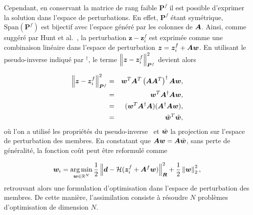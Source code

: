 Cependant, en conservant la matrice de rang faible $\bm P^f$ il est possible d'exprimer la solution dans l'espace de perturbations. En effet, $\bm P^f$ étant symétrique, $\text{Span}(\bm P^f)$ est bijectif avec l'espace généré par les colonnes de $\bm A$.
Ainsi, comme suggéré par Hunt et al.~\cite{Hunt2007}, la perturbation $\bm z -\bm z^f_i$ est exprimée comme une combinaison linéaire dans l'espace de perturbation $\bm z = \bm z^f_i + \bm A \bm w$. En utilisant le pseudo-inverse indiqué par $^\dagger$, le terme $\left\lVert \bm z -\bm z^f_i \right\rVert^2_{\bm P^f}$ devient alors

\begin{eqnarray*}
    \left\lVert \bm z -\bm z^f_i \right\rVert^2_{\bm P^f} &=&  \bm w^T \bm A^T\left(\bm A \bm A^T\right)^\dagger \bm A \bm w,\\
    &=&\bm w^T \bm A^\dagger  \bm A \bm w,\\
    &=&(\bm w^T \bm A^\dagger  \bm A) (\bm A^\dagger  \bm A \bm w), \\
    &=& \tilde{\bm w}^T \tilde{\bm w},
\end{eqnarray*}où l'on a utilisé les propriétés du pseudo-inverse~\cite{ben-israel2003generalized} et $\tilde{\bm w}$ la projection sur l'espace de perturbation des membres. En constatant que $\bm A \bm w =\bm A \tilde{\bm w}$, sans perte de généralité, la fonction coût peut être reformulé comme

\begin{equation*}
    \bm w_i = \operatorname*{arg\,min}_{\bm w \in \mathbb R^N} \frac12 \left\lVert \bm d - \mathcal H(\bm{z}_i^f + \bm A^f \bm w) \right\rVert^2_{\bm R} + \frac12 \left\lVert \bm w \right\rVert_2^2,
\end{equation*}retrouvant alors une formulation d'optimisation dans l'espace de perturbation des membres. De cette manière, l'assimilation consiste à résoudre $N$ problèmes d'optimisation de dimension $N$.




